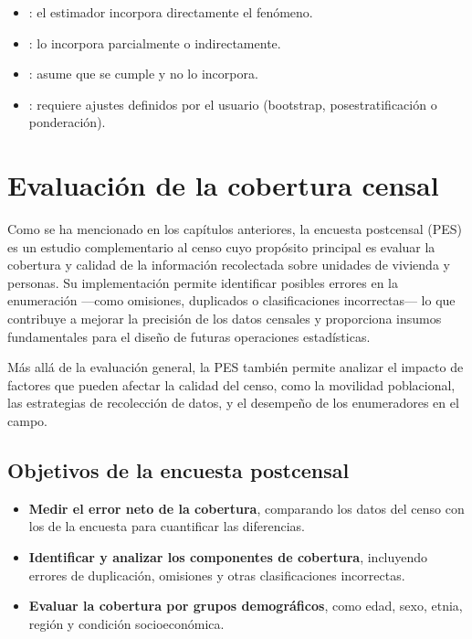 \documentclass[
  12pt,
]{book}
\providecommand{\tightlist}{%
  \setlength{\itemsep}{0pt}\setlength{\parskip}{0pt}}
\begin{document}
\begin{itemize}
	\item {} : el estimador incorpora directamente el fenómeno.
	\item {} : lo incorpora parcialmente o indirectamente.
	\item {} : asume que se cumple y no lo incorpora.
	\item {} : requiere ajustes definidos por el usuario (bootstrap, posestratificación o ponderación).
\end{itemize}


\chapter{Evaluación de la cobertura censal}\label{evaluaciuxf3n-de-la-cobertura-censal}

Como se ha mencionado en los capítulos anteriores, la encuesta postcensal (PES) es un estudio complementario al censo cuyo propósito principal es evaluar la cobertura y calidad de la información recolectada sobre unidades de vivienda y personas. Su implementación permite identificar posibles errores en la enumeración ---como omisiones, duplicados o clasificaciones incorrectas--- lo que contribuye a mejorar la precisión de los datos censales y proporciona insumos fundamentales para el diseño de futuras operaciones estadísticas.

Más allá de la evaluación general, la PES también permite analizar el impacto de factores que pueden afectar la calidad del censo, como la movilidad poblacional, las estrategias de recolección de datos, y el desempeño de los enumeradores en el campo.

\section{Objetivos de la encuesta postcensal}\label{objetivos-de-la-encuesta-postcensal}

\begin{itemize}
\tightlist
\item
  \textbf{Medir el error neto de la cobertura}, comparando los datos del censo con los de la encuesta para cuantificar las diferencias.
\item
  \textbf{Identificar y analizar los componentes de cobertura}, incluyendo errores de duplicación, omisiones y otras clasificaciones incorrectas.
\item
  \textbf{Evaluar la cobertura por grupos demográficos}, como edad, sexo, etnia, región y condición socioeconómica.
\end{itemize}
\end{document}
